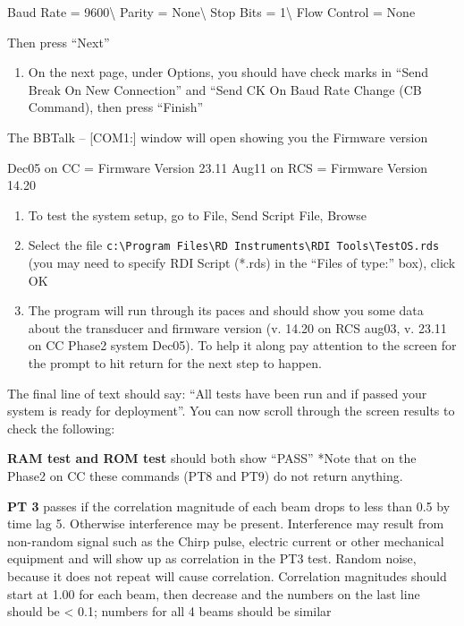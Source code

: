 \documentclass[]{book}
\providecommand{\tightlist}{%
  \setlength{\itemsep}{0pt}\setlength{\parskip}{0pt}}
\theoremstyle{definition}
\theoremstyle{definition}
\theoremstyle{definition}
\theoremstyle{remark}
\begin{document}
Baud Rate = 9600\textbackslash{} Parity = None\textbackslash{} Stop Bits
= 1\textbackslash{} Flow Control = None

Then press ``Next''

\begin{enumerate}
\def\labelenumi{\arabic{enumi}.}
\setcounter{enumi}{4}
\tightlist
\item
  On the next page, under Options, you should have check marks in ``Send
  Break On New Connection'' and ``Send CK On Baud Rate Change (CB
  Command), then press ``Finish''
\end{enumerate}

The BBTalk -- {[}COM1:{]} window will open showing you the Firmware
version

Dec05 on CC = Firmware Version 23.11 Aug11 on RCS = Firmware Version
14.20

\begin{enumerate}
\def\labelenumi{\arabic{enumi}.}
\setcounter{enumi}{5}
\item
  To test the system setup, go to File, Send Script File, Browse
\item
  Select the file
  \texttt{c:\textbackslash{}Program\ Files\textbackslash{}RD\ Instruments\textbackslash{}RDI\ Tools\textbackslash{}TestOS.rds}
  (you may need to specify RDI Script (*.rds) in the ``Files of type:''
  box), click OK
\item
  The program will run through its paces and should show you some data
  about the transducer and firmware version (v. 14.20 on RCS aug03, v.
  23.11 on CC Phase2 system Dec05). To help it along pay attention to
  the screen for the prompt to hit return for the next step to happen.
\end{enumerate}

The final line of text should say: ``All tests have been run and if
passed your system is ready for deployment''. You can now scroll through
the screen results to check the following:

\textbf{RAM test and ROM test} should both show ``PASS'' *Note that on
the Phase2 on CC these commands (PT8 and PT9) do not return anything.

\textbf{PT 3} passes if the correlation magnitude of each beam drops to
less than 0.5 by time lag 5. Otherwise interference may be present.
Interference may result from non-random signal such as the Chirp pulse,
electric current or other mechanical equipment and will show up as
correlation in the PT3 test. Random noise, because it does not repeat
will cause correlation. Correlation magnitudes should start at 1.00 for
each beam, then decrease and the numbers on the last line should be
\textless{} 0.1; numbers for all 4 beams should be similar
\end{document}
